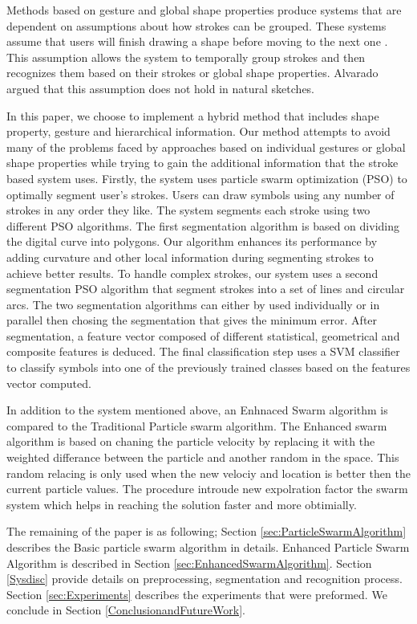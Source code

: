 \documentclass[preprint,1p,times,review]{elsarticle}
\begin{document}
 Methods based on gesture and global shape properties produce systems that are dependent on assumptions about how strokes can be grouped. These systems assume that users will finish drawing a shape before moving to the next one \cite{Cali63,geometrydomain49}. This assumption allows the system to temporally group strokes and then recognizes them based on their strokes or global shape properties. Alvarado \cite{AlvaradoDigital} argued that this assumption does not hold in natural sketches.


In this paper, we choose to implement a hybrid method that includes shape property, gesture and hierarchical information. Our method attempts to avoid many of the problems faced by approaches based on individual gestures or global shape properties while trying to gain the additional information that the stroke based system uses. Firstly, the system uses particle swarm optimization (PSO) to optimally segment user's strokes. Users can draw symbols using any number of strokes in any order they like. The system segments each stroke using two different PSO algorithms. The first segmentation algorithm is based on dividing the digital curve into polygons\cite{PolygonApproximationPSO}. Our algorithm enhances its performance by adding curvature and other local information during segmenting strokes to achieve better results. To handle complex strokes, our system uses a second segmentation PSO algorithm that segment strokes into a set of lines and circular arcs. The two segmentation algorithms can either by used individually or in parallel then chosing the segmentation that gives the minimum error. After segmentation, a feature vector composed of different statistical, geometrical and composite features is deduced. The final classification step uses a SVM classifier to classify symbols into one of the previously trained classes based on the features vector computed\cite{mypaper}.


  In addition to the system mentioned above, an Enhnaced Swarm algorithm is compared to the Traditional Particle swarm algorithm\cite{stockPaper}. The Enhanced swarm algorithm is based on chaning the particle velocity by replacing it with the weighted differance between the particle and another random in the space. This random relacing is only used when the new velociy and location is better then the current particle values. The procedure introude new expolration factor the swarm system which helps in reaching the solution faster and more obtimially.


The remaining of the paper is as following; Section
\ref{sec:ParticleSwarmAlgorithm} describes the Basic particle swarm algorithm in
details.  Enhanced Particle Swarm Algorithm is described in Section
\ref{sec:EnhancedSwarmAlgorithm}. Section \ref{Sysdisc} provide details on
preprocessing, segmentation and recognition process. Section
\ref{sec:Experiments} describes the experiments that were preformed. We conclude
in Section \ref{ConclusionandFutureWork}.
\end{document}
